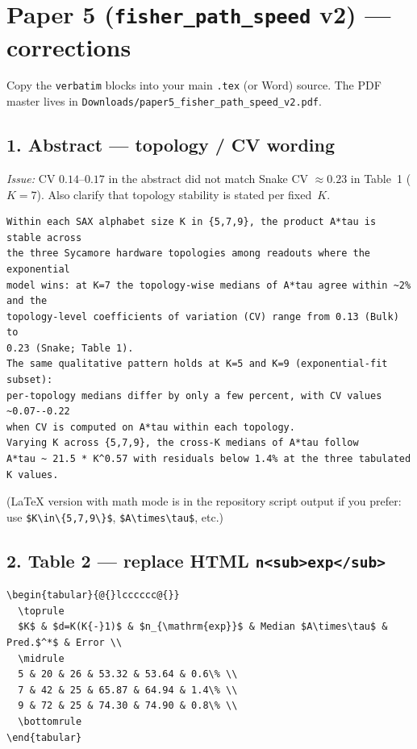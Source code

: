 \documentclass[11pt]{article}
\begin{document}
\section*{Paper 5 (\texttt{fisher\_path\_speed} v2) --- corrections}

Copy the \texttt{verbatim} blocks into your main \texttt{.tex} (or Word) source.
The PDF master lives in \verb|Downloads/paper5_fisher_path_speed_v2.pdf|.

\subsection*{1. Abstract --- topology / CV wording}

\textit{Issue:} CV $0.14$--$0.17$ in the abstract did not match Snake CV $\approx 0.23$
in Table~1 ($K{=}7$). Also clarify that topology stability is stated per fixed~$K$.

\begin{verbatim}
Within each SAX alphabet size K in {5,7,9}, the product A*tau is stable across
the three Sycamore hardware topologies among readouts where the exponential
model wins: at K=7 the topology-wise medians of A*tau agree within ~2% and the
topology-level coefficients of variation (CV) range from 0.13 (Bulk) to
0.23 (Snake; Table 1).
The same qualitative pattern holds at K=5 and K=9 (exponential-fit subset):
per-topology medians differ by only a few percent, with CV values ~0.07--0.22
when CV is computed on A*tau within each topology.
Varying K across {5,7,9}, the cross-K medians of A*tau follow
A*tau ~ 21.5 * K^0.57 with residuals below 1.4% at the three tabulated K values.
\end{verbatim}

\noindent(LaTeX version with math mode is in the repository script output if you
prefer: use \verb|$K\in\{5,7,9\}$|, \verb|$A\times\tau$|, etc.)

\subsection*{2. Table 2 --- replace HTML \texttt{n<sub>exp</sub>}}

\begin{verbatim}
\begin{tabular}{@{}lcccccc@{}}
  \toprule
  $K$ & $d=K(K{-}1)$ & $n_{\mathrm{exp}}$ & Median $A\times\tau$ & Pred.$^*$ & Error \\
  \midrule
  5 & 20 & 26 & 53.32 & 53.64 & 0.6\% \\
  7 & 42 & 25 & 65.87 & 64.94 & 1.4\% \\
  9 & 72 & 25 & 74.30 & 74.90 & 0.8\% \\
  \bottomrule
\end{tabular}
\end{verbatim}
\end{document}
